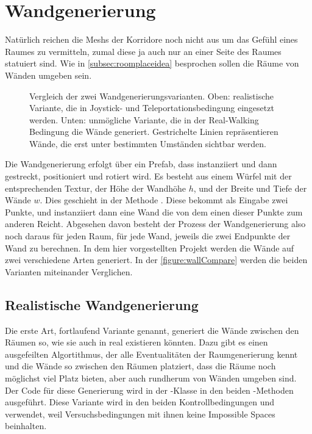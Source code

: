 
\section{Wandgenerierung}
\label{sec:genwalls}
Natürlich reichen die Meshs der Korridore noch nicht aus um das Gefühl eines Raumes zu vermitteln, zumal diese ja auch nur an einer Seite des Raumes statuiert sind.
Wie in \autoref{subsec:roomplaceidea} besprochen sollen die Räume von Wänden umgeben sein.

\begin{figure}[H]
    \centering

    \scalebox{0.4}{}
    \caption{Vergleich der zwei Wandgenerierungsvarianten. Oben: realistische Variante, die in Joystick- und Teleportationsbedingung eingesetzt werden. Unten: unmögliche Variante, die in der Real-Walking Bedingung die Wände generiert. Gestrichelte Linien repräsentieren Wände, die erst unter bestimmten Umständen sichtbar werden.}
    \label{figure:wallCompare}
\end{figure}

Die Wandgenerierung erfolgt über ein Prefab, dass instanziiert und dann gestreckt, positioniert und rotiert wird. Es besteht aus einem Würfel mit der entsprechenden Textur, der Höhe der Wandhöhe $h$, und der Breite und Tiefe der Wände $w$.
Dies geschieht in der Methode . Diese bekommt als Eingabe zwei Punkte, und instanziiert dann eine Wand die von dem einen dieser Punkte zum anderen Reicht. %
Abgesehen davon besteht der Prozess der Wandgenerierung also noch daraus für jeden Raum, für jede Wand, jeweils die zwei Endpunkte der Wand zu berechnen.
In dem hier vorgestellten Projekt werden die Wände auf zwei verschiedene Arten generiert. In der \autoref{figure:wallCompare} werden die beiden Varianten miteinander Verglichen.

\subsection{Realistische Wandgenerierung}\label{subsec:realwallgen}
Die erste Art, fortlaufend  Variante genannt, generiert die Wände zwischen den Räumen so, wie sie auch in real existieren könnten.
Dazu gibt es einen ausgefeilten Algortithmus, der alle Eventualitäten der Raumgenerierung kennt und die Wände so zwischen den Räumen platziert, dass die Räume noch möglichst viel Platz bieten, aber auch rundherum von Wänden umgeben sind. Der Code für diese Generierung wird in der -Klasse in den beiden -Methoden ausgeführt. Diese Variante wird in den beiden Kontrollbedingungen  und  verwendet, weil Versuchsbedingungen mit ihnen keine Impossible Spaces beinhalten.

